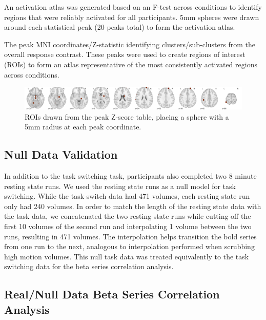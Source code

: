 \documentclass[10pt,letterpaper]{article}
\begin{document}
An activation atlas was generated based on an F-test across conditions
to identify regions that were reliably activated for all participants.
5mm spheres were drawn around each statistical peak (20 peaks total)
to form the activation atlas.

\begin{table}[H]
  \caption{
    The peak MNI coordinates/Z-statistic identifying clusters/sub-clusters from the overall
    response contrast.
    These peaks were used to create regions of interest (ROIs) to form an atlas representative
    of the most consistently activated regions across conditions.
  }
  \label{table:clusters}
\end{table}


\begin{figure}[H]
  \centering
  \includegraphics[width=\textwidth]{activation_roi_map}
  \caption{
    ROIs drawn from the peak Z-score table, placing a sphere with a 5mm radius
    at each peak coordinate.
  }
  \label{fig:methroimap}
\end{figure}

\subsection*{Null Data Validation}
\label{methods:null-bold}

In addition to the task switching task, participants also completed
two 8 minute resting state runs.
We used the resting state runs as a null model for task switching.
While the task switch data had 471 volumes, each resting state run only had
240 volumes.
In order to match the length of the resting state data with the task data, we concatenated
the two resting state runs while cutting off the first 10 volumes of the second run
and interpolating 1 volume between the two runs, resulting in 471 volumes.
The interpolation helps transition the bold series from one run to the next,
analogous to interpolation performed when scrubbing high motion volumes. 
This null task data was treated equivalently to the task switching data for the
beta series correlation analysis.

\subsection*{Real/Null Data Beta Series Correlation Analysis}
\label{methods:data-bsc}
\end{document}
